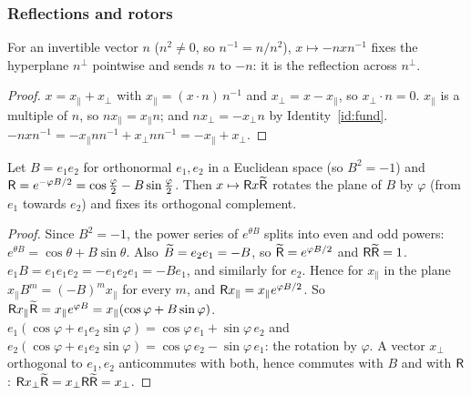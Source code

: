 \subsubsection*{Reflections and rotors}

\begin{identity}\label{id:refl}
For an invertible vector $n$ ($n^2\neq0$, so $n^{-1}=n/n^2$), $x\mapsto-nxn^{-1}$ fixes the hyperplane $n^\perp$ pointwise and
sends $n$ to $-n$: it is the reflection across $n^\perp$.
\end{identity}
\begin{proof}
 $x=x_\parallel+x_\perp$ with $x_\parallel=(x\cdot n)\,n^{-1}$ and $x_\perp=x-x_\parallel$, so $x_\perp\cdot n=0$.
 $x_\parallel$ is a multiple of $n$, so $nx_\parallel=x_\parallel n$; and $nx_\perp=-x_\perp n$ by Identity~\ref{id:fund}.
 $-nxn^{-1}=-x_\parallel nn^{-1}+x_\perp nn^{-1}=-x_\parallel+x_\perp$.
\end{proof}

\begin{identity}\label{id:rotor}
Let $B=e_1e_2$ for orthonormal $e_1,e_2$ in a Euclidean space (so $B^2=-1$) and $\mathsf{R}=e^{-\varphi B/2}=\cos\frac\varphi2-B\sin\frac\varphi2$.
Then $x\mapsto\mathsf{R} x\widetilde{\mathsf{R}}$ rotates the plane of $B$ by $\varphi$ (from $e_1$ towards $e_2$) and fixes its orthogonal complement.
\end{identity}
\begin{proof}
 Since $B^2=-1$, the power series of $e^{\theta B}$ splits into even and odd powers: $e^{\theta B}=\cos\theta+B\sin\theta$.
Also $\widetilde{B}=e_2e_1=-B$, so $\widetilde{\mathsf{R}}=e^{\varphi B/2}$ and $\mathsf{R}\widetilde{\mathsf{R}}=1$.
 $e_1B=e_1e_1e_2=-e_1e_2e_1=-Be_1$, and similarly for $e_2$. Hence for $x_\parallel$ in the
plane $x_\parallel B^m=(-B)^mx_\parallel$ for every $m$, and $\mathsf{R} x_\parallel=x_\parallel e^{\varphi B/2}$.
So $\mathsf{R} x_\parallel\widetilde{\mathsf{R}}=x_\parallel e^{\varphi B}=x_\parallel(\cos\varphi+B\sin\varphi)$.
 $e_1(\cos\varphi+e_1e_2\sin\varphi)=\cos\varphi\,e_1+\sin\varphi\,e_2$ and
$e_2(\cos\varphi+e_1e_2\sin\varphi)=\cos\varphi\,e_2-\sin\varphi\,e_1$: the rotation by $\varphi$.
 A vector $x_\perp$ orthogonal to $e_1,e_2$ anticommutes with both, hence commutes with $B$ and with $\mathsf{R}$:
$\mathsf{R} x_\perp\widetilde{\mathsf{R}}=x_\perp\mathsf{R}\widetilde{\mathsf{R}}=x_\perp$.
\end{proof}


